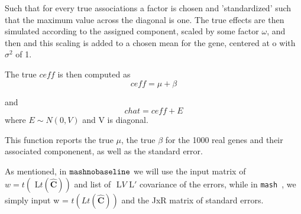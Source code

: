 \documentclass[11pt, oneside]{article}   	%
\newcommand{\chat}{\bm{\hat{C}}}
\def\lstar{\text{ L}}
\def\mash{{\tt mash }}
\def\mnb{{\tt mashnobaseline }}
\begin{document}
Such that for every true associations a factor is chosen and 'standardized' such that the maximum value across the diagonal is one. The true effects are then simulated according to the assigned component, scaled by some factor $\omega$, and then and this scaling is added to a chosen mean for the gene, centered at o with $\sigma^{2}$ of 1. 

The true $ceff$ is then computed as 
$$ceff = \mu + \beta$$ 

and
$$chat = ceff + E$$ where $E \sim N(0,V)$ and V is diagonal.

This function reports the true $\mu$, the true $\beta$ for the 1000 real genes and their associated componenent, as well as the standard error.

As mentioned, in $\mnb$ we will use the input matrix of $w = t(\lstar t(\chat))$ and list of $\lstar V \lstar'$ covariance of the errors, while in \mash{}, we simply input w = $t (L t(\chat))$  and the JxR matrix of standard errors.
\end{document}
